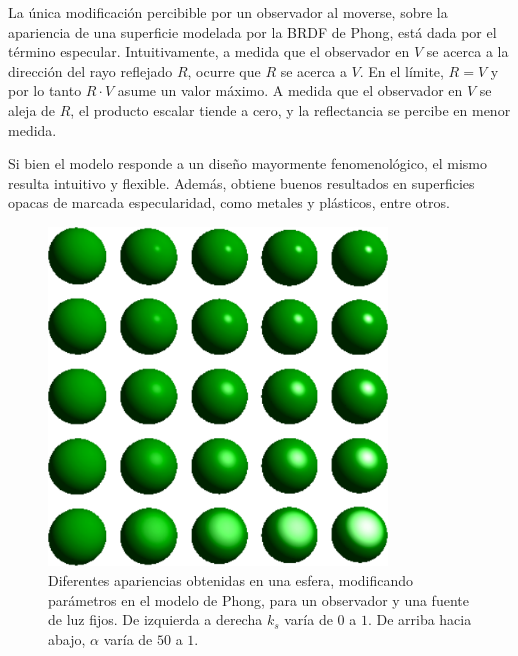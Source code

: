 La única modificación percibible por un observador al moverse, sobre la apariencia de una superficie modelada por la BRDF de Phong, está dada por el término especular.
Intuitivamente, a medida que el observador en $V$ se acerca a la dirección del rayo reflejado $R$, ocurre que $R$ se acerca a $V$. En el límite, $R = V$
y por lo tanto $R \cdot V$ asume un valor máximo.
A medida que el observador en $V$ se aleja de $R$, el producto escalar tiende a cero, y la reflectancia se percibe en menor medida.

Si bien el modelo responde a un diseño mayormente fenomenológico, el mismo resulta intuitivo y flexible.
Además, obtiene buenos resultados en superficies opacas de marcada especularidad, como metales y plásticos, entre otros.

\begin{figure}
\center
\includegraphics[width=9cm]{figures/phongparametros}
\caption[Diferentes apariencias en el modelo de Phong]{Diferentes apariencias obtenidas en una esfera, modificando parámetros en el modelo de Phong, para un observador y una fuente de luz fijos. De izquierda a derecha $k_{s}$ varía de $0$ a $1$. De arriba hacia abajo, $\alpha$ varía de $50$ a $1$.}
\label{fg:phongparametros}
\end{figure}



